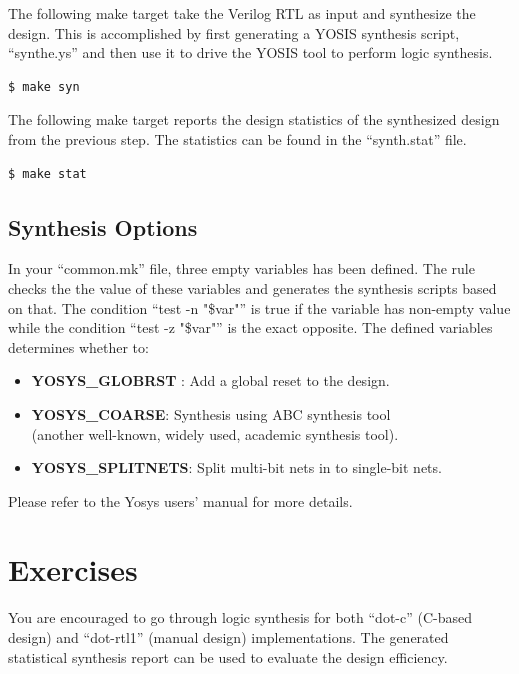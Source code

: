 \documentclass[12pt]{article}
\newcommand{\quotes}[1]{``#1''}
\begin{document}
The following make target take the Verilog RTL as input and synthesize
the design. This is accomplished by first generating a YOSIS synthesis
script, \quotes{synthe.ys} and then use it to drive the YOSIS tool to
perform logic synthesis.

\begin{lstlisting}[language=bash]
  $ make syn
\end{lstlisting}

The following make target reports the design statistics of the
synthesized design from the previous step. The statistics can be found
in the \quotes{synth.stat} file.

\begin{lstlisting}[language=bash]
  $ make stat
\end{lstlisting}

\subsection{Synthesis Options}

In your \quotes{common.mk} file, three empty variables has been
defined. The rule checks the the value of these variables and
generates the synthesis scripts based on that. The condition
\quotes{test -n "\$var"} is true if the variable has non-empty value
while the condition \quotes{test -z "\$var"} is the exact
opposite. The defined variables determines whether to:

\begin{itemize}
\item \textbf{YOSYS\_GLOBRST} : Add a global reset to the design.
\item \textbf{YOSYS\_COARSE}: Synthesis using ABC synthesis tool\\(another well-known, widely used, academic synthesis tool).
\item \textbf{YOSYS\_SPLITNETS}: Split multi-bit nets in to single-bit nets.
\end{itemize}

Please refer to the Yosys users' manual for more details.

\section{Exercises}

You are encouraged to go through logic synthesis for both
\quotes{dot-c} (C-based design) and \quotes{dot-rtl1} (manual design)
implementations.  The generated statistical synthesis report can be
used to evaluate the design efficiency.
\end{document}
